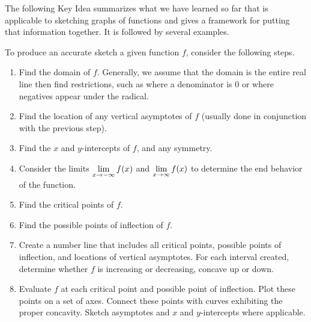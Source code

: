 The following Key Idea summarizes what we have learned so far that is applicable to sketching graphs of functions and gives a framework for putting that information together. It is followed by several examples.

\begin{keyidea}\label{idea:sketch}%
To produce an accurate sketch a given function $f$, consider the following steps.
\begin{enumerate}
	\item	Find the domain of $f$. Generally, we assume that the domain is the entire real line then find restrictions, such as where a denominator is 0 or where negatives appear under the radical.
	\item	Find the location of any vertical asymptotes of $f$ (usually done in conjunction with the previous step).
	\item	Find the $x$ and $y$-intercepts of $f$, and any symmetry.
	\item	Consider the limits $\displaystyle\lim_{x\to-\infty}f(x)$ and $\displaystyle\lim_{x\to\infty}f(x)$ to determine the end behavior of the function.
	\item	Find the critical points of $f$.
	\item	Find the possible points of inflection of $f$.
	\item	Create a number line that includes all critical points, possible points of inflection, and locations of vertical asymptotes. For each interval created, determine whether $f$ is increasing or decreasing, concave up or down.
	\item	Evaluate $f$ at each critical point and possible point of inflection. Plot these points on a set of axes. Connect these points with curves exhibiting the proper concavity. Sketch asymptotes and $x$ and $y$-intercepts where applicable.
\end{enumerate}
\end{keyidea}


